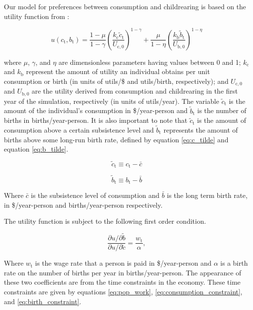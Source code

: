\documentclass[letterpaper,12pt]{article}
\begin{document}
Our model for preferences between consumption and childrearing is based on the utility function from \citet{Jones2001}:

\begin{equation} \label{eq:utility_function}
	u(c_\mathrm{t}, b_\mathrm{t}) = \frac{1-\mu}{1-\gamma} \left(\frac{k_\mathrm{c} \tilde c_\mathrm{t}}{U_\mathrm{c,0}} \right)^{1-\gamma} + \frac{\mu}{1-\eta} \left(\frac{k_\mathrm{b} \tilde b_\mathrm{t}}{U_\mathrm{b,0}} \right)^{1-\eta}
\end{equation}

\noindent where $\mu$, $\gamma$, and $\eta$ are dimensionless parameters having values between 0 and 1; $k_\mathrm{c}$ and $k_\mathrm{b}$ represent the amount of utility an individual obtains per unit consumption or birth (in units of utils/\$ and utils/birth, respectively); and $U_{\mathrm{c,0}}$ and $U_{\mathrm{b,0}}$ are the utility derived from consumption and childrearing in the first year of the simulation, respectively (in units of utils/year). The variable $\tilde c_\mathrm{t}$ is the amount of the individual's consumption in \$/year-person and $\tilde b_\mathrm{t}$ is the number of births in births/year-person. It is also important to note that $\tilde c_\mathrm{t}$ is the amount of consumption above a certain subsistence level and $\tilde b_\mathrm{t}$ represents the amount of births above some long-run birth rate, defined by equation \ref{eq:c_tilde} and equation \ref{eq:b_tilde}.

\begin{equation} \label{eq:c_tilde}
	\tilde c_\mathrm{t} \equiv c_\mathrm{t} - \bar c
\end{equation}

\begin{equation} \label{eq:b_tilde}
	\tilde b_\mathrm{t} \equiv b_\mathrm{t} - \bar b
\end{equation}

Where $\bar c$ is the subsistence level of consumption and $\bar b$ is the long term birth rate, in \$/year-person and births/year-person respectively.

The utility function is subject to the following first order condition.

\begin{equation} \label{eq:first_order_condition}
	\frac{\partial u/ \partial\tilde b}{\partial u/ \partial\tilde c} = \frac{w_\mathrm{t}}{\alpha},
\end{equation}

Where $w_\mathrm{t}$ is the wage rate that a person is paid in \$/year-person and $\alpha$ is a birth rate on the number of births per year in births/year-person. The appearance of these two coefficients are from the time constraints in the economy. These time constraints are given by equations \ref{eq:pop_work}, \ref{eq:consumption_constraint}, and \ref{eq:birth_constraint}.
\end{document}

